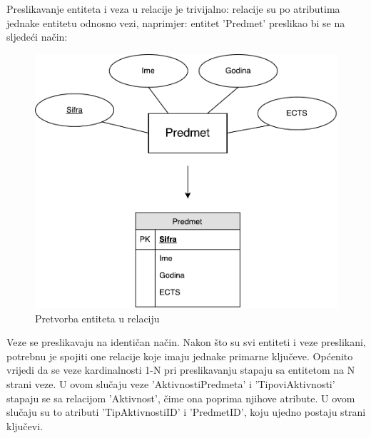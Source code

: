 \documentclass[times, utf8, zavrsni]{fer}
\begin{document}
Preslikavanje entiteta i veza u relacije je trivijalno: relacije su po atributima jednake entitetu odnosno vezi, naprimjer: entitet 'Predmet' preslikao bi se na sljedeći način:\\

\begin{figure}[H]
\centering
\includegraphics[width=\textwidth,height=\textheight,keepaspectratio]{img/relacija-predmet.pdf}
\caption{Pretvorba entiteta u relaciju}
\label{fig:relacija-predmet}
\end{figure}
\clearpage

Veze se preslikavaju na identičan način.
Nakon što su svi entiteti i veze preslikani, potrebnu je spojiti one relacije koje imaju jednake primarne ključeve. Općenito vrijedi da se veze kardinalnosti 1-N pri preslikavanju stapaju sa entitetom na N strani veze. U ovom slučaju veze 'AktivnostiPredmeta' i 'TipoviAktivnosti' stapaju se sa relacijom 'Aktivnost', čime ona poprima njihove atribute. U ovom slučaju su to atributi 'TipAktivnostiID' i 'PredmetID', koju ujedno postaju strani ključevi.\\
\end{document}
